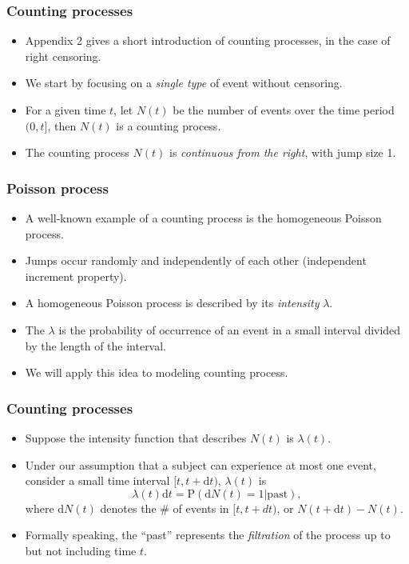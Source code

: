 \documentclass[10pt]{beamer}\usepackage[]{graphicx}\usepackage[]{color}
\newcommand{\dif}{\mathrm{d}}
\newcommand{\dt}{\mathrm{d}t}
\newcommand{\empr}[1]{{\emph{\color{red}#1}}}
\newcommand{\p}{\mathrm{P}}
\begin{document}
\begin{frame}
  \frametitle{Counting processes}
  \begin{itemize}  
  \item Appendix 2 gives a short introduction of counting processes, in the case of right censoring. 
  \item We start by focusing on a \empr{single type} of event without censoring.
  \item For a given time $t$, let $N(t)$ be the number of events over the time period $(0, t]$, 
    then $N(t)$ is a counting process.
  \item The counting process $N(t)$ is \empr{continuous from the right}, with jump size 1.
  \end{itemize}    
\end{frame}


\begin{frame}
  \frametitle{Poisson process}
  \begin{itemize}  
  \item A well-known example of a counting process is the homogeneous Poisson process.
  \item Jumps occur randomly and independently of each other (independent increment property).
  \item A homogeneous Poisson process is described by its \empr{intensity} $\lambda$.
  \item The $\lambda$ is the probability of occurrence of an event in a small interval divided by the length of the interval.
  \item We will apply this idea to modeling counting process.
  \end{itemize}    
\end{frame}

\begin{frame}
  \frametitle{Counting processes}
  \begin{itemize}  
  \item Suppose the intensity function that describes $N(t)$ is $\lambda(t)$.
  \item Under our assumption that a subject can experience at most one event, 
    consider a small time interval $[t, t + \dt)$,
    $\lambda(t)$ is
    \begin{equation*}
      \lambda(t) \dt = \p(\dif N(t) = 1|\mbox{past}),
    \end{equation*}
    where $\dif N(t)$ denotes the \# of events in $[t, t + dt)$, or $N(t + \dt) - N(t)$.
  \item Formally speaking, the ``past'' represents the \empr{filtration} of the process up to but not including time $t$.
  \end{itemize}    
\end{frame}
\end{document}

